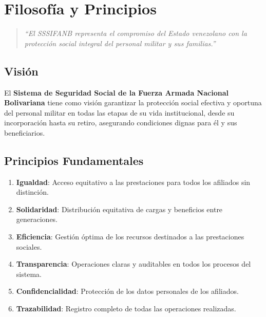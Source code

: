 
\chapter*{Filosofía y Principios}

\begin{quote}
\textit{``El SSSIFANB representa el compromiso del Estado venezolano con la protección social integral del personal militar y sus familias.''}
\end{quote}

\section*{Visión}

El \textbf{Sistema de Seguridad Social de la Fuerza Armada Nacional Bolivariana} tiene como visión garantizar la protección social efectiva y oportuna del personal militar en todas las etapas de su vida institucional, desde su incorporación hasta su retiro, asegurando condiciones dignas para él y sus beneficiarios.

\section*{Principios Fundamentales}

\begin{enumerate}[leftmargin=*]
    \item \textbf{Igualdad}: Acceso equitativo a las prestaciones para todos los afiliados sin distinción.
    
    \item \textbf{Solidaridad}: Distribución equitativa de cargas y beneficios entre generaciones.
    
    \item \textbf{Eficiencia}: Gestión óptima de los recursos destinados a las prestaciones sociales.
    
    \item \textbf{Transparencia}: Operaciones claras y auditables en todos los procesos del sistema.
    
    \item \textbf{Confidencialidad}: Protección de los datos personales de los afiliados.
    
    \item \textbf{Trazabilidad}: Registro completo de todas las operaciones realizadas.
\end{enumerate}

